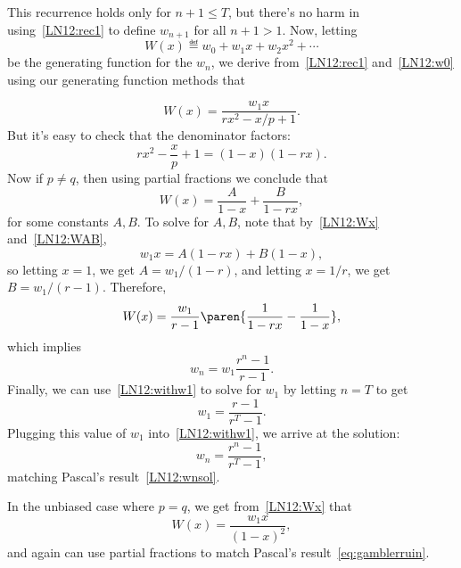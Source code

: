 This recurrence holds only for $n+1 \leq T$, but there's no harm in
using~\eqref{LN12:rec1} to define $w_{n+1}$ for all $n+1 >1$.  Now, letting
\[
W(x) \eqdef w_0 + w_1x + w_2x^2 + \cdots
\]
be the generating function for the $w_n$, we derive from~\eqref{LN12:rec1}
and~\eqref{LN12:w0} using our generating function methods that
\iffalse
\[
W(x) -\frac{xW(x)}{p} + rx^2W(x) = w_1x,
\]
so
\fi
\begin{equation}\label{LN12:Wx}
W(x) = \frac{w_1x}{rx^2- x/p + 1}.
\end{equation}
But it's easy to check that the denominator factors:
\[
rx^2 - \frac{x}{p} + 1 = (1-x)(1-rx).
\]
Now if $p \neq q$, then using partial fractions we conclude that
\begin{equation}\label{LN12:WAB}
W(x) = \frac{A}{1-x} + \frac{B}{1-rx},
\end{equation}
for some constants $A,B$.  To solve for $A,B$, note that
by~\eqref{LN12:Wx} and~\eqref{LN12:WAB},
\[
w_1 x = A(1-rx) + B(1-x),
\]
so letting $x=1$, we get $A=w_1/(1-r)$, and letting $x=1/r$, we get
$B=w_1/(r-1)$.  Therefore,
\[
W(x) = \frac{w_1}{r-1} \paren{\frac{1}{1-rx} - \frac{1}{1-x}},
\]
which implies
\begin{equation}\label{LN12:withw1}
w_n = w_1\frac{r^n - 1}{r-1}.
\end{equation}
Finally, we can use~\eqref{LN12:withw1} to solve for $w_1$ by letting
$n=T$ to get \iffalse
\[
1=w_T = \frac{w_1}{r-1}\paren{r^T - 1}
\]
so
\fi
\[
w_1= \frac{r - 1}{r^T-1}.
\]
Plugging this value of $w_1$ into~\eqref{LN12:withw1}, we arrive at
the solution:
\[
w_n = \frac{r^n-1}{r^T -1},
\]
matching Pascal's result~\eqref{LN12:wnsol}.

In the unbiased case where $p=q$, we get from~\eqref{LN12:Wx} that
\[
W(x) = \frac{w_1 x}{(1-x)^2},
\]
and again can use partial fractions to match Pascal's
result~\eqref{eq:gamblerruin}.

\iffalse
Our derivation of~(\ref{LN12:wnsol}) ensures that it gives a formula for $w_n$
which satisfies~(\ref{LN12:rec1}) and has the right values at $n=0$ and $n=T$.
Moreover, the values determined by~(\ref{LN12:wnsol}) are the \emph{only ones}
that satisfy~(\ref{LN12:rec1}) and the boundary conditions at $0$ and $T$,
though we won't prove this.  This implies that the Gambler's probability
of winning is indeed given by~(\ref{LN12:wnsol}).
\fi

